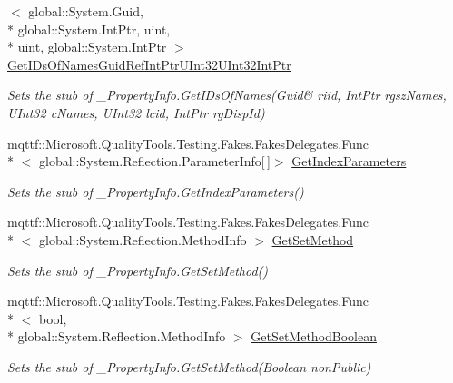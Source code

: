 \begin{DoxyCompactItemize}
$<$ global\-::\-System.\-Guid, \\*
global\-::\-System.\-Int\-Ptr, uint, \\*
uint, global\-::\-System.\-Int\-Ptr $>$ \hyperlink{class_system_1_1_runtime_1_1_interop_services_1_1_fakes_1_1_stub___property_info_a9e1af011735221518d67355a7ff9f43b}{Get\-I\-Ds\-Of\-Names\-Guid\-Ref\-Int\-Ptr\-U\-Int32\-U\-Int32\-Int\-Ptr}
\begin{DoxyCompactList}\small\item\em Sets the stub of \-\_\-\-Property\-Info.\-Get\-I\-Ds\-Of\-Names(Guid\& riid, Int\-Ptr rgsz\-Names, U\-Int32 c\-Names, U\-Int32 lcid, Int\-Ptr rg\-Disp\-Id)\end{DoxyCompactList}\item 
mqttf\-::\-Microsoft.\-Quality\-Tools.\-Testing.\-Fakes.\-Fakes\-Delegates.\-Func\\*
$<$ global\-::\-System.\-Reflection.\-Parameter\-Info\mbox{[}$\,$\mbox{]}$>$ \hyperlink{class_system_1_1_runtime_1_1_interop_services_1_1_fakes_1_1_stub___property_info_a05b43c4370768a55bb72001a1c16aff8}{Get\-Index\-Parameters}
\begin{DoxyCompactList}\small\item\em Sets the stub of \-\_\-\-Property\-Info.\-Get\-Index\-Parameters()\end{DoxyCompactList}\item 
mqttf\-::\-Microsoft.\-Quality\-Tools.\-Testing.\-Fakes.\-Fakes\-Delegates.\-Func\\*
$<$ global\-::\-System.\-Reflection.\-Method\-Info $>$ \hyperlink{class_system_1_1_runtime_1_1_interop_services_1_1_fakes_1_1_stub___property_info_ae68aa377b07e4037c676108c8f223005}{Get\-Set\-Method}
\begin{DoxyCompactList}\small\item\em Sets the stub of \-\_\-\-Property\-Info.\-Get\-Set\-Method()\end{DoxyCompactList}\item 
mqttf\-::\-Microsoft.\-Quality\-Tools.\-Testing.\-Fakes.\-Fakes\-Delegates.\-Func\\*
$<$ bool, \\*
global\-::\-System.\-Reflection.\-Method\-Info $>$ \hyperlink{class_system_1_1_runtime_1_1_interop_services_1_1_fakes_1_1_stub___property_info_ad8867ee1e8d6c528ad30913c3d33eef0}{Get\-Set\-Method\-Boolean}
\begin{DoxyCompactList}\small\item\em Sets the stub of \-\_\-\-Property\-Info.\-Get\-Set\-Method(\-Boolean non\-Public)\end{DoxyCompactList}\item 

\end{DoxyCompactItemize}
